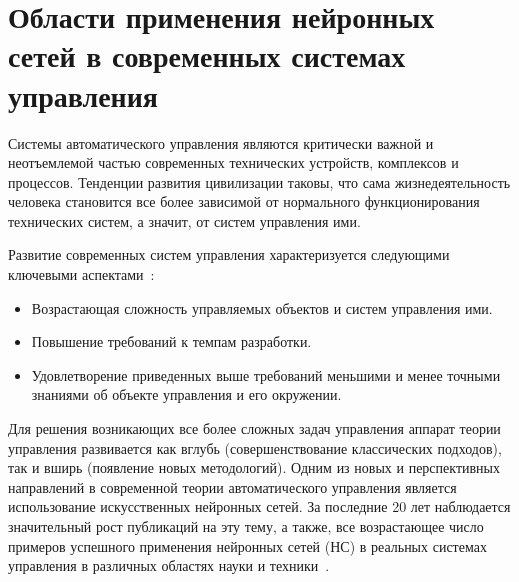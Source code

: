 
\section{Области применения нейронных сетей в современных системах
         управления}%


Системы автоматического управления являются критически важной и
неотъемлемой частью современных технических устройств, комплексов и
процессов.  Тенденции развития цивилизации таковы, что сама
жизнедеятельность человека становится все более зависимой от
нормального функционирования технических систем, а значит, от систем
управления ими.

Развитие современных систем управления характеризуется следующими
ключевыми аспектами~\cite{kulee96}:

\begin{itemize}

\item
Возрастающая сложность управляемых объектов и систем управления ими.

\item
Повышение требований к темпам разработки.

\item
Удовлетворение приведенных выше требований меньшими и менее точными
знаниями об объекте управления и его окружении.

\end{itemize}

Для решения возникающих все более сложных задач управления аппарат
теории управления развивается как вглубь (совершенствование
классических подходов), так и вширь (появление новых методологий).
Одним из новых и перспективных направлений в современной теории
автоматического управления является использование искусственных
нейронных сетей.  За последние 20 лет наблюдается значительный рост
публикаций на эту тему, а также, все возрастающее число примеров
успешного применения нейронных сетей (НС) в реальных системах
управления в различных областях науки и техники~\cite{bondlog97}.



